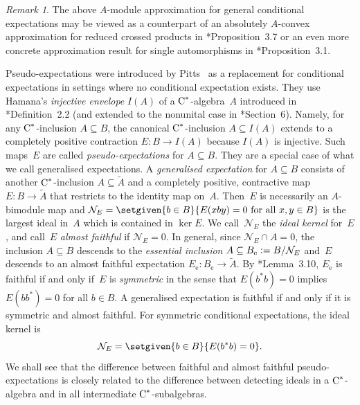 \documentclass[a4paper]{amsart}
\theoremstyle{plain}
\theoremstyle{definition}
\theoremstyle{remark}
\newtheorem{remark}[theorem]{Remark}
\numberwithin{theorem}{section}
\numberwithin{equation}{section}
\newcommand*{\nb}{\nobreakdash}
\newcommand*{\Null}{\mathcal N}%
\newcommand*{\ess}{\mathrm{e}}%
\newcommand*{\Cst}{\textup C^*}%
\newcommand*{\defeq}{\mathrel{\vcentcolon=}}%
\begin{document}
\begin{remark}
  The above \(A\)\nb-module approximation for general conditional
  expectations may be viewed as a counterpart of an absolutely
  \(A\)\nb-convex approximation for reduced crossed products in
  \cite{Kennedy-Ursu:Intermediate_subalgebras_crossed}*{Proposition~3.7}
  or an even more concrete approximation result for single
  automorphisms in
  \cite{Cameron-Smith:Galois_reduced}*{Proposition~3.1}.
\end{remark}

Pseudo-expectations were introduced by
Pitts~\cite{Pitts-Zarikian:Unique_pseudoexpectation} as a replacement
for conditional expectations in settings where no conditional
expectation exists.
They use Hamana's \emph{injective envelope} \(I(A)\) of a
\(\Cst\)\nb-algebra~\(A\) introduced in
\cite{Hamana:Injective-Envelope-Cstar}*{Definition~2.2} (and extended
to the nonunital case in \cite{Hamana:tensorI}*{Section~6}).
Namely, for any \(\Cst\)\nb-inclusion \(A\subseteq B\), the canonical
\(\Cst\)\nb-inclusion \(A\subseteq I(A)\) extends to a completely
positive contraction \(E\colon B\to I(A)\)
because \(I(A)\) is injective.
Such maps~\(E\) are called \emph{pseudo-expectations} for \(A\subseteq
B\).
They are a special case of what we call generalised expectations.
A \emph{generalised expectation} for \(A\subseteq B\) consists of
another \(\Cst\)\nb-inclusion \(A\subseteq \tilde{A}\) and a
completely positive, contractive map \(E\colon B \to \tilde{A}\) that
restricts to the identity map on~\(A\).
Then~\(E\) is necessarily an \(A\)\nb-bimodule map and
\(\Null_E=\setgiven{b\in B}{E(x b y)=0 \text{ for all }x,y\in B}\) is
the largest ideal in~\(A\) which is contained in \(\ker E\).
We call~\(\Null_E\) the \emph{ideal kernel} for~\(E\), and call~\(E\)
\emph{almost faithful} if \(\Null_E=0\).
In general, since \(\Null_E\cap A=0\), the inclusion \(A\subseteq B\)
descends to the \emph{essential inclusion} \(A\subseteq B_\ess\defeq
B/\Null_E\) and~\(E\) descends to an almost faithful expectation
\(E_\ess\colon B_\ess\to \tilde{A}\).
By \cite{Kwasniewski-Meyer:Essential}*{Lemma~3.10}, \(E_\ess\) is
faithful if and only if~\(E\) is \emph{symmetric} in the sense that
\(E(b^*b)=0\) implies \(E(bb^*)=0\) for all \(b\in B\).
A generalised expectation is faithful if and only if it is symmetric
and almost faithful.
For symmetric conditional expectations, the ideal kernel is
\[
\Null_E=\setgiven{b\in B}{E(b^*b)=0}.
\]
We shall see that the difference between faithful and almost faithful
pseudo-expectations is closely related to the difference between
detecting ideals in a \(\Cst\)\nb-algebra and in all intermediate
\(\Cst\)\nb-subalgebras.
\end{document}
